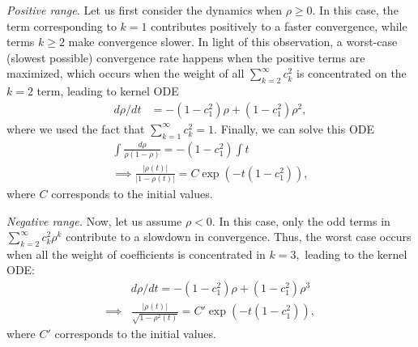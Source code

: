 \documentclass[twoside]{article}
\newcommand{\km}{\kappa_\phi}
\theoremstyle{definition}
\newcommand{\thomas}[1]{{\color{blue}\textit{#1}}}
\begin{document}
\textit{Positive range.}
Let us first consider the dynamics when $\rho\ge 0.$ 
In this case, the term corresponding to $k=1$ contributes positively to a faster convergence, while terms $k\ge 2$ make convergence slower. In light of this observation, a worst-case (slowest possible) convergence rate happens when the positive terms are maximized, which occurs when the weight of all $\sum_{k=2}^\infty c_k^2 $ is concentrated on the $k=2$ term, leading to kernel ODE
\begin{align*}
    d\rho/dt &=  -(1-c_1^2)\rho + (1-c_1^2) \rho^2,
\end{align*}
where we used the fact that $\sum_{k=1}^\infty c_k^2 = 1.$ 
Finally, we can solve this ODE 
\begin{align*}
     \int \frac{d\rho}{\rho(1-\rho)} = - (1-c_1^2)\int t \\
     \implies \frac{|\rho(t)|}{|1-\rho(t)|} = C \exp(-t(1-c_1^2)),
\end{align*}
where $C$ corresponds to the initial values. 


\textit{Negative range.}
Now, let us assume $\rho<0.$ In this case, only the odd terms in $\sum_{k=2}^\infty c_k^2 \rho^k$ contribute to a slowdown in convergence. Thus, the worst case occurs when all the weight of coefficients is concentrated in $k=3,$ leading to the kernel ODE:
\begin{align*}
&d\rho/dt = -(1-c_1^2)\rho + (1-c_1^2) \rho^3\\
\implies &\frac{|\rho(t)|}{\sqrt{1-\rho^2(t)}} = C' \exp(-t(1-c_1^2)),
\end{align*}
where $C'$ corresponds to the initial values. 
\end{document}
